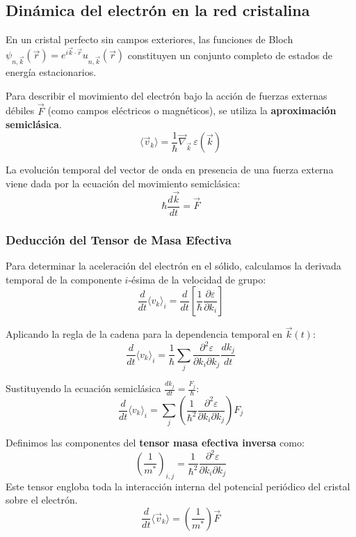 \newpage
\subsection{Dinámica del electrón en la red cristalina}

En un cristal perfecto sin campos exteriores, las funciones de Bloch $\psi_{n,\vec{k}}(\vec{r}) = e^{i \vec{k} \cdot \vec{r}} u_{n,\vec{k}}(\vec{r})$ constituyen un conjunto completo de estados de energía estacionarios. %

Para describir el movimiento del electrón bajo la acción de fuerzas externas débiles $\vec{F}$ (como campos eléctricos o magnéticos), se utiliza la \textbf{aproximación semiclásica}. %
\[
\langle \vec{v}_k \rangle = \frac{1}{\hbar} \vec{\nabla}_{\vec{k}} \, \varepsilon(\vec{k}) %
\]

La evolución temporal del vector de onda en presencia de una fuerza externa viene dada por la ecuación del movimiento semiclásica: %
\[
\hbar \frac{d\vec{k}}{dt} = \vec{F} %
\]

\subsubsection{Deducción del Tensor de Masa Efectiva}

Para determinar la aceleración del electrón en el sólido, calculamos la derivada temporal de la componente $i$-ésima de la velocidad de grupo: %
\[
\frac{d}{dt} \langle v_k \rangle_i = \frac{d}{dt} \left[ \frac{1}{\hbar} \frac{\partial \varepsilon}{\partial k_i} \right] %
\]

Aplicando la regla de la cadena para la dependencia temporal en $\vec{k}(t)$: %
\[
\frac{d}{dt} \langle v_k \rangle_i = \frac{1}{\hbar} \sum_j \frac{\partial^2 \varepsilon}{\partial k_i \partial k_j} \frac{dk_j}{dt} %
\]

Sustituyendo la ecuación semiclásica $\frac{dk_j}{dt} = \frac{F_j}{\hbar}$: %
\[
\frac{d}{dt} \langle v_k \rangle_i = \sum_j \left( \frac{1}{\hbar^2} \frac{\partial^2 \varepsilon}{\partial k_i \partial k_j} \right) F_j %
\]

\begin{concepto}
Definimos las componentes del \textbf{tensor masa efectiva inversa} como: %
\[
\left( \frac{1}{m^*} \right)_{i,j} = \frac{1}{\hbar^2} \frac{\partial^2 \varepsilon}{\partial k_i \partial k_j} %
\]
Este tensor engloba toda la interacción interna del potencial periódico del cristal sobre el electrón. %
\[
\frac{d}{dt} \langle \vec{v}_k \rangle = \left( \frac{1}{m^*} \right) \vec{F} %
\]
\end{concepto}

